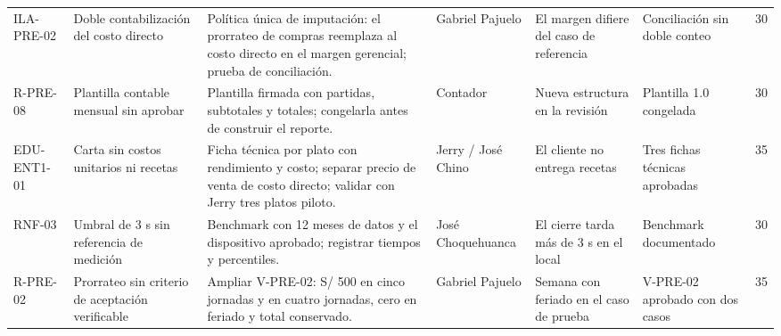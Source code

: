 \begin{landscape}
{\begin{longtable}{L{2.4cm} L{3.0cm} L{5.5cm} L{2.3cm} L{3.3cm} L{3.5cm} R{1.6cm}}
ILA-PRE-02 & Doble contabilización del costo directo & Política única de imputación: el prorrateo de compras reemplaza al costo directo en el margen gerencial; prueba de conciliación. & Gabriel Pajuelo & El margen difiere del caso de referencia & Conciliación sin doble conteo & 30 \\
R-PRE-08 & Plantilla contable mensual sin aprobar & Plantilla firmada con partidas, subtotales y totales; congelarla antes de construir el reporte. & Contador & Nueva estructura en la revisión & Plantilla 1.0 congelada & 30 \\
EDU-ENT1-01 & Carta sin costos unitarios ni recetas & Ficha técnica por plato con rendimiento y costo; separar precio de venta de costo directo; validar con Jerry tres platos piloto. & Jerry / José Chino & El cliente no entrega recetas & Tres fichas técnicas aprobadas & 35 \\
RNF-03 & Umbral de 3 s sin referencia de medición & Benchmark con 12 meses de datos y el dispositivo aprobado; registrar tiempos y percentiles. & José Choquehuanca & El cierre tarda más de 3 s en el local & Benchmark documentado & 30 \\
R-PRE-02 & Prorrateo sin criterio de aceptación verificable & Ampliar V-PRE-02: S/ 500 en cinco jornadas y en cuatro jornadas, cero en feriado y total conservado. & Gabriel Pajuelo & Semana con feriado en el caso de prueba & V-PRE-02 aprobado con dos casos & 35 \\
\end{longtable}
}
\end{landscape}
